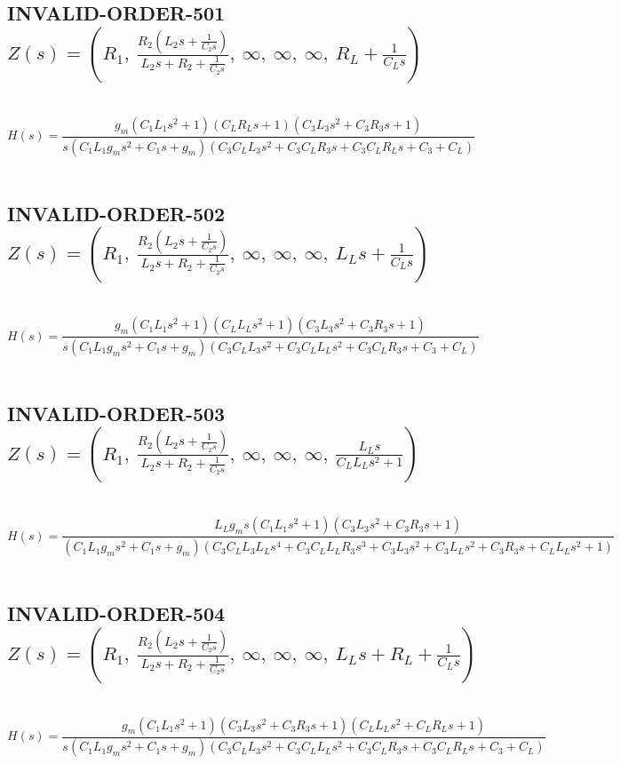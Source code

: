 \documentclass{article}
\begin{document}
\subsection{INVALID-ORDER-501 $Z(s) = \left( R_{1}, \  \frac{R_{2} \left(L_{2} s + \frac{1}{C_{2} s}\right)}{L_{2} s + R_{2} + \frac{1}{C_{2} s}}, \  \infty, \  \infty, \  \infty, \  R_{L} + \frac{1}{C_{L} s}\right)$ } \ 
\textbf{\[H(s) = \frac{g_{m} \left(C_{1} L_{1} s^{2} + 1\right) \left(C_{L} R_{L} s + 1\right) \left(C_{3} L_{3} s^{2} + C_{3} R_{3} s + 1\right)}{s \left(C_{1} L_{1} g_{m} s^{2} + C_{1} s + g_{m}\right) \left(C_{3} C_{L} L_{3} s^{2} + C_{3} C_{L} R_{3} s + C_{3} C_{L} R_{L} s + C_{3} + C_{L}\right)}\] } \ 
\subsection{INVALID-ORDER-502 $Z(s) = \left( R_{1}, \  \frac{R_{2} \left(L_{2} s + \frac{1}{C_{2} s}\right)}{L_{2} s + R_{2} + \frac{1}{C_{2} s}}, \  \infty, \  \infty, \  \infty, \  L_{L} s + \frac{1}{C_{L} s}\right)$ } \ 
\textbf{\[H(s) = \frac{g_{m} \left(C_{1} L_{1} s^{2} + 1\right) \left(C_{L} L_{L} s^{2} + 1\right) \left(C_{3} L_{3} s^{2} + C_{3} R_{3} s + 1\right)}{s \left(C_{1} L_{1} g_{m} s^{2} + C_{1} s + g_{m}\right) \left(C_{3} C_{L} L_{3} s^{2} + C_{3} C_{L} L_{L} s^{2} + C_{3} C_{L} R_{3} s + C_{3} + C_{L}\right)}\] } \ 
\subsection{INVALID-ORDER-503 $Z(s) = \left( R_{1}, \  \frac{R_{2} \left(L_{2} s + \frac{1}{C_{2} s}\right)}{L_{2} s + R_{2} + \frac{1}{C_{2} s}}, \  \infty, \  \infty, \  \infty, \  \frac{L_{L} s}{C_{L} L_{L} s^{2} + 1}\right)$ } \ 
\textbf{\[H(s) = \frac{L_{L} g_{m} s \left(C_{1} L_{1} s^{2} + 1\right) \left(C_{3} L_{3} s^{2} + C_{3} R_{3} s + 1\right)}{\left(C_{1} L_{1} g_{m} s^{2} + C_{1} s + g_{m}\right) \left(C_{3} C_{L} L_{3} L_{L} s^{4} + C_{3} C_{L} L_{L} R_{3} s^{3} + C_{3} L_{3} s^{2} + C_{3} L_{L} s^{2} + C_{3} R_{3} s + C_{L} L_{L} s^{2} + 1\right)}\] } \ 
\subsection{INVALID-ORDER-504 $Z(s) = \left( R_{1}, \  \frac{R_{2} \left(L_{2} s + \frac{1}{C_{2} s}\right)}{L_{2} s + R_{2} + \frac{1}{C_{2} s}}, \  \infty, \  \infty, \  \infty, \  L_{L} s + R_{L} + \frac{1}{C_{L} s}\right)$ } \ 
\textbf{\[H(s) = \frac{g_{m} \left(C_{1} L_{1} s^{2} + 1\right) \left(C_{3} L_{3} s^{2} + C_{3} R_{3} s + 1\right) \left(C_{L} L_{L} s^{2} + C_{L} R_{L} s + 1\right)}{s \left(C_{1} L_{1} g_{m} s^{2} + C_{1} s + g_{m}\right) \left(C_{3} C_{L} L_{3} s^{2} + C_{3} C_{L} L_{L} s^{2} + C_{3} C_{L} R_{3} s + C_{3} C_{L} R_{L} s + C_{3} + C_{L}\right)}\] } \ 
\end{document}
